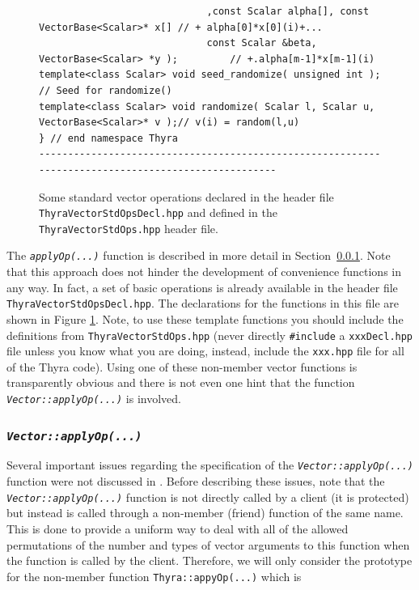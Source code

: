 \documentclass[pdf,ps2pdf,11pt]{SANDreport}
\begin{document}
{\begin{figure}[p]
\begin{minipage}{\textwidth}
{\begin{verbatim}
                             ,const Scalar alpha[], const VectorBase<Scalar>* x[] // + alpha[0]*x[0](i)+...
                             const Scalar &beta, VectorBase<Scalar> *y );         // +.alpha[m-1]*x[m-1](i)
template<class Scalar> void seed_randomize( unsigned int );                   // Seed for randomize()
template<class Scalar> void randomize( Scalar l, Scalar u, VectorBase<Scalar>* v );// v(i) = random(l,u)
} // end namespace Thyra
----------------------------------------------------------------------------------------------------
\end{verbatim}}
\end{minipage}
\caption{
\label{tsfcore:fig:std_vec_ops}
Some standard vector operations declared in the header file
{}\texttt{Thyra\-Vector\-Std\-Ops\-Decl.hpp} and defined in the
{}\texttt{Thyra\-Vector\-Std\-Ops.hpp} header file.
}
\end{figure}
\esinglespace}

The {}\texttt{\textit{applyOp(\-...)}}  function is described in more detail
in Section~\ref{tsfcore:sec:vec_apply_op}.  Note that this approach does not
hinder the development of convenience functions in any way.  In fact, a set of
basic operations is already available in the header file
{}\texttt{Thyra\-Vector\-Std\-Ops\-Decl.hpp}.  The declarations for the
functions in this file are shown in Figure {}\ref{tsfcore:fig:std_vec_ops}.
Note, to use these template functions you should include the definitions from
{}\texttt{Thyra\-Vector\-Std\-Ops.hpp} (never directly {}\texttt{\#include} a
{}\texttt{xxxDecl.hpp} file unless you know what you are doing, instead,
include the {}\texttt{xxx.hpp} file for all of the Thyra code).  Using one of
these non-member vector functions is transparently obvious and there is not
even one hint that the function {}\texttt{\textit{Vector::applyOp(\-...)}} is
involved.

%
\subsubsection{\texttt{\textit{Vector::applyOp(\-...)}}}
\label{tsfcore:sec:vec_apply_op}
%

Several important issues regarding the specification of the
{}\texttt{\textit{Vector::applyOp(\-...)}} function were not discussed
in {}\cite{ref:rtop_toms}.  Before describing these issues, note that
the {}\texttt{\textit{Vector\-::applyOp(\-...)}} function is not
directly called by a client (it is protected) but instead is called
through a non-member (friend) function of the same name.  This is done
to provide a uniform way to deal with all of the allowed permutations
of the number and types of vector arguments to this function when the
function is called by the client.  Therefore, we will only consider
the prototype for the non-member function
{}\texttt{Thyra::appyOp(...)}  which is
\end{document}
